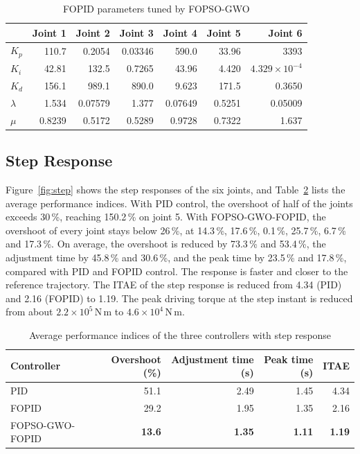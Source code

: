 \documentclass{svproc}
\begin{document}
\begin{table}[!htb]
\caption{FOPID parameters tuned by FOPSO-GWO}
\label{tab:gains}
\centering
\begin{tabular}{lrrrrrr}
\toprule
 & Joint 1 & Joint 2 & Joint 3 & Joint 4 & Joint 5 & Joint 6\\
\midrule
$K_p$     & 110.7 & 0.2054 & 0.03346 & 590.0 & 33.96 & 3393\\
$K_i$     & 42.81 & 132.5 & 0.7265 & 43.96 & 4.420 & $4.329 \times 10^{-4}$\\
$K_d$     & 156.1 & 989.1 & 890.0 & 9.623 & 171.5 & 0.3650\\
$\lambda$ & 1.534 & 0.07579 & 1.377 & 0.07649 & 0.5251 & 0.05009\\
$\mu$     & 0.8239 & 0.5172 & 0.5289 & 0.9728 & 0.7322 & 1.637\\
\bottomrule
\end{tabular}
\end{table}

\FloatBarrier
\subsection{Step Response}

Figure~\ref{fig:step} shows the step responses of the six joints, and Table~\ref{tab:step}
lists the average performance indices. With PID control, the overshoot of half of the joints
exceeds 30\,\%, reaching 150.2\,\% on joint 5. With FOPSO-GWO-FOPID, the overshoot of every
joint stays below 26\,\%, at 14.3\,\%, 17.6\,\%, 0.1\,\%, 25.7\,\%, 6.7\,\% and 17.3\,\%.
On average, the overshoot is reduced by 73.3\,\% and 53.4\,\%, the adjustment time by
45.8\,\% and 30.6\,\%, and the peak time by 23.5\,\% and 17.8\,\%, compared with PID and
FOPID control. The response is faster and closer to the reference trajectory. The ITAE of
the step response is reduced from 4.34 (PID) and 2.16 (FOPID) to 1.19. The peak driving
torque at the step instant is reduced from about $2.2 \times 10^5$\,N\,m to
$4.6 \times 10^4$\,N\,m.

\begin{table}[!htb]
\caption{Average performance indices of the three controllers with step response}
\label{tab:step}
\centering
\begin{tabular}{lrrrr}
\toprule
Controller & Overshoot (\%) & Adjustment time (s) & Peak time (s) & ITAE\\
\midrule
PID             & 51.1 & 2.49 & 1.45 & 4.34\\
FOPID           & 29.2 & 1.95 & 1.35 & 2.16\\
FOPSO-GWO-FOPID & \textbf{13.6} & \textbf{1.35} & \textbf{1.11} & \textbf{1.19}\\
\bottomrule
\end{tabular}
\end{table}
\end{document}
